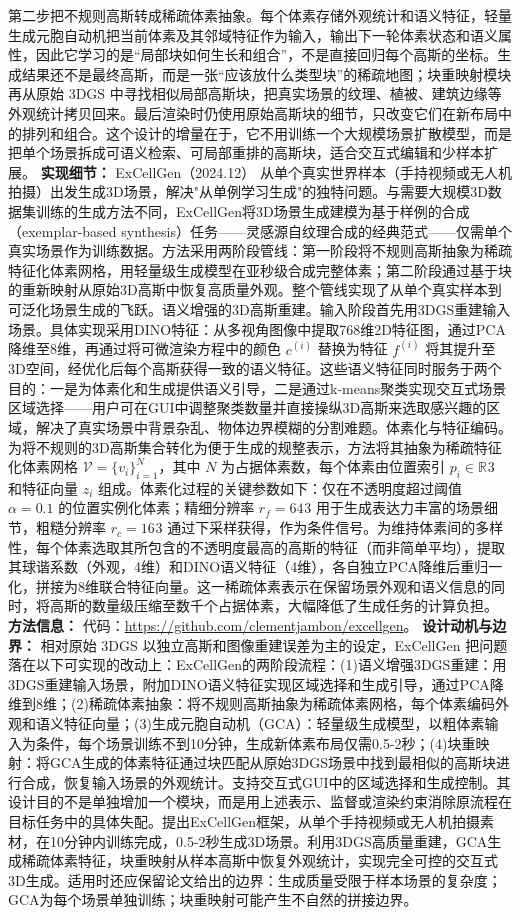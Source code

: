 第二步把不规则高斯转成稀疏体素抽象。每个体素存储外观统计和语义特征，轻量生成元胞自动机把当前体素及其邻域特征作为输入，输出下一轮体素状态和语义属性，因此它学习的是“局部块如何生长和组合”，不是直接回归每个高斯的坐标。生成结果还不是最终高斯，而是一张“应该放什么类型块”的稀疏地图；块重映射模块再从原始 3DGS 中寻找相似局部高斯块，把真实场景的纹理、植被、建筑边缘等外观统计拷贝回来。最后渲染时仍使用原始高斯块的细节，只改变它们在新布局中的排列和组合。这个设计的增量在于，它不用训练一个大规模场景扩散模型，而是把单个场景拆成可语义检索、可局部重排的高斯块，适合交互式编辑和少样本扩展。
\textbf{实现细节：} ExCellGen（2024.12） 从单个真实世界样本（手持视频或无人机拍摄）出发生成3D场景，解决"从单例学习生成"的独特问题。与需要大规模3D数据集训练的生成方法不同，ExCellGen将3D场景生成建模为基于样例的合成（exemplar-based synthesis）任务——灵感源自纹理合成的经典范式——仅需单个真实场景作为训练数据。方法采用两阶段管线：第一阶段将不规则高斯抽象为稀疏特征化体素网格，用轻量级生成模型在亚秒级合成完整体素；第二阶段通过基于块的重新映射从原始3D高斯中恢复高质量外观。整个管线实现了从单个真实样本到可泛化场景生成的飞跃。语义增强的3D高斯重建。输入阶段首先用3DGS重建输入场景。具体实现采用DINO特征：从多视角图像中提取768维2D特征图，通过PCA降维至8维，再通过将可微渲染方程中的颜色 $c^{(i)}$ 替换为特征 $f^{(i)}$ 将其提升至3D空间，经优化后每个高斯获得一致的语义特征。这些语义特征同时服务于两个目的：一是为体素化和生成提供语义引导，二是通过k-means聚类实现交互式场景区域选择——用户可在GUI中调整聚类数量并直接操纵3D高斯来选取感兴趣的区域，解决了真实场景中背景杂乱、物体边界模糊的分割难题。体素化与特征编码。为将不规则的3D高斯集合转化为便于生成的规整表示，方法将其抽象为稀疏特征化体素网格 $\mathcal{V} = \{v_i\}_{i=1}^N$，其中 $N$ 为占据体素数，每个体素由位置索引 $p_i \in \mathbb{R}^{}3$ 和特征向量 $z_i$ 组成。体素化过程的关键参数如下：仅在不透明度超过阈值 $\alpha=0.1$ 的位置实例化体素；精细分辨率 $r_f = 64^{}3$ 用于生成表达力丰富的场景细节，粗糙分辨率 $r_c = 16^{}3$ 通过下采样获得，作为条件信号。为维持体素间的多样性，每个体素选取其所包含的不透明度最高的高斯的特征（而非简单平均），提取其球谐系数（外观，4维）和DINO语义特征（4维），各自独立PCA降维后重归一化，拼接为8维联合特征向量。这一稀疏体素表示在保留场景外观和语义信息的同时，将高斯的数量级压缩至数千个占据体素，大幅降低了生成任务的计算负担。
\textbf{方法信息：} 代码：\url{https://github.com/clementjambon/excellgen}。
\textbf{设计动机与边界：} 相对原始 3DGS 以独立高斯和图像重建误差为主的设定，ExCellGen 把问题落在以下可实现的改动上：ExCellGen的两阶段流程：(1)语义增强3DGS重建：用3DGS重建输入场景，附加DINO语义特征实现区域选择和生成引导，通过PCA降维到8维；(2)稀疏体素抽象：将不规则高斯抽象为稀疏体素网格，每个体素编码外观和语义特征向量；(3)生成元胞自动机（GCA）：轻量级生成模型，以粗体素输入为条件，每个场景训练不到10分钟，生成新体素布局仅需0.5-2秒；(4)块重映射：将GCA生成的体素特征通过块匹配从原始3DGS场景中找到最相似的高斯块进行合成，恢复输入场景的外观统计。支持交互式GUI中的区域选择和生成控制。其设计目的不是单独增加一个模块，而是用上述表示、监督或渲染约束消除原流程在目标任务中的具体失配。提出ExCellGen框架，从单个手持视频或无人机拍摄素材，在10分钟内训练完成，0.5-2秒生成3D场景。利用3DGS高质量重建，GCA生成稀疏体素特征，块重映射从样本高斯中恢复外观统计，实现完全可控的交互式3D生成。适用时还应保留论文给出的边界：生成质量受限于样本场景的复杂度；GCA为每个场景单独训练；块重映射可能产生不自然的拼接边界。
